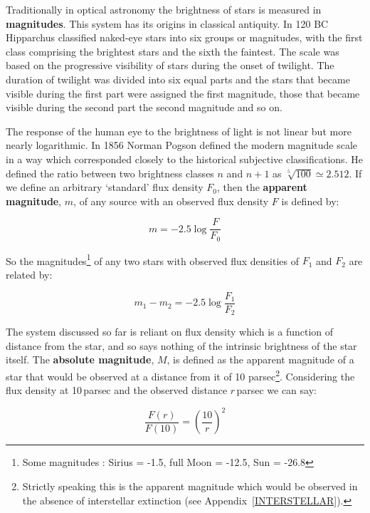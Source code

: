 \documentclass[twoside,11pt]{article}
\begin{document}
Traditionally in optical astronomy the brightness of stars is measured
in {\bf magnitudes}.  This system has its origins in classical
antiquity.  In 120 BC Hipparchus classified naked-eye stars into
six groups or magnitudes, with the first class comprising the brightest
stars and the sixth the faintest.  The scale was based on the
progressive visibility of stars during the onset of twilight.  The
duration of twilight was divided into six equal parts and the stars that
became visible during the first part were assigned the first magnitude,
those that became visible during the second part the second magnitude
and so on.

The response of the human eye to the brightness of light is not linear
but more nearly logarithmic. In 1856 Norman Pogson defined the modern
magnitude scale in a way which corresponded closely to the historical
subjective classifications.  He defined the ratio between two brightness
classes $n$ and $n+1$ as $\sqrt[5]{100} \simeq 2.512$.  If we define an
arbitrary `standard' flux density $F_0$, then the {\bf apparent
magnitude}, $m$, of any source with an observed flux density $F$ is
defined by:

\begin{equation}
m= -2.5 \log \frac{F}{F_0}
\end{equation}

So the magnitudes\footnote{Some magnitudes : Sirius = -1.5, full Moon
= -12.5, Sun = -26.8} of any two stars with observed flux densities of
$F_1$ and $F_2$ are related by:

\begin{equation}
m_1 - m_2 = -2.5 \log \frac{F_1}{F_2}
\end{equation}

The system discussed so far is reliant on flux density which is a
function of distance from the star, and so says nothing of the
intrinsic brightness of the star itself. The {\bf absolute magnitude},
$M$, is defined as the apparent magnitude of a star that would be
observed at a distance from it of 10 parsec\footnote{Strictly speaking
this is the apparent magnitude which would be observed in the absence
of interstellar extinction (see Appendix~\ref{INTERSTELLAR}).}. Considering
the flux density at 10\,parsec and the observed distance $r$\,parsec we
can say:

\begin{equation}
\frac{F(r)}{F(10)} = \left( \frac{10}{r} \right)^{2}
\end{equation}
\end{document}
